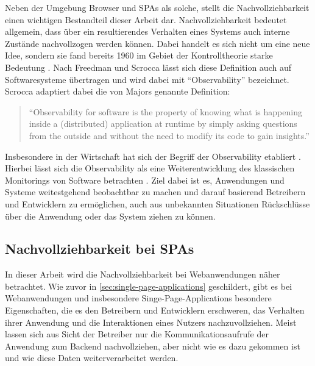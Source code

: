 Neben der Umgebung Browser und SPAs als solche, stellt die Nachvollziehbarkeit einen wichtigen Bestandteil dieser Arbeit dar. Nachvollziehbarkeit bedeutet allgemein, dass über ein resultierendes Verhalten eines Systems auch interne Zustände nachvollzogen werden können. Dabei handelt es sich nicht um eine neue Idee, sondern sie fand bereits 1960 im Gebiet der Kontrolltheorie starke Bedeutung \cite{OnTheGeneralTheoryOfControlSystems}. Nach Freedman \cite{TestabilityOfSoftwareComponents} und Scrocca \etal \cite{TheKaijuProjectPaper} lässt sich diese Definition auch auf Softwaresysteme übertragen und wird dabei mit \enquote{Observability} bezeichnet. Scrocca adaptiert dabei die von Majors \cite{MajorsObservability} genannte Definition:

\begin{quotation}
\enquote{Observability for software is the property of knowing what is happening inside a (distributed) application at runtime by simply asking questions from the outside and without the need to modify its code to gain insights.}
\end{quotation}

Insbesondere in der Wirtschaft hat sich der Begriff der Observability etabliert \cite{DynatraceObservability} \cite{NewRelicObservability}. Hierbei lässt sich die Observability als eine Weiterentwicklung des klassischen Monitorings von Software betrachten \cite{TheNewStackMonitoringAndObservability}. Ziel dabei ist es, Anwendungen und Systeme weitestgehend beobachtbar zu machen und darauf basierend Betreibern und Entwicklern zu ermöglichen, auch aus unbekannten Situationen Rückschlüsse über die Anwendung oder das System ziehen zu können.

\subsection{Nachvollziehbarkeit bei SPAs}
\label{sec:nachvollziehbarkeit-bei-spas}

In dieser Arbeit wird die Nachvollziehbarkeit bei Webanwendungen näher betrachtet. Wie zuvor in \autoref{sec:single-page-applications} geschildert, gibt es bei Webanwendungen und insbesondere Singe-Page-Applications besondere Eigenschaften, die es den Betreibern und Entwicklern erschweren, das Verhalten ihrer Anwendung und die Interaktionen eines Nutzers nachzuvollziehen. Meist lassen sich aus Sicht der Betreiber nur die Kommunikationsaufrufe der Anwendung zum Backend nachvollziehen, aber nicht wie es dazu gekommen ist und wie diese Daten weiterverarbeitet werden.

